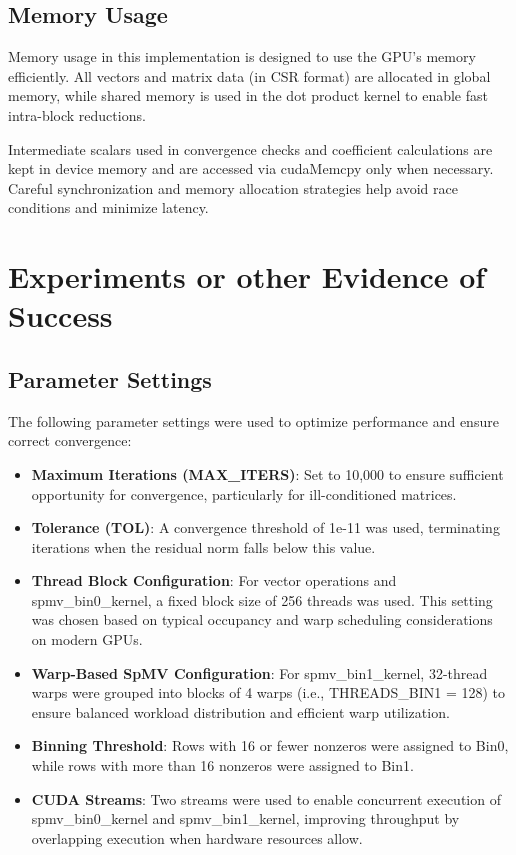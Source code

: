 \documentclass[conference]{IEEEtran}
\begin{document}
\subsection{Memory Usage}
Memory usage in this implementation is designed to use the GPU’s memory efficiently. All vectors and matrix data (in CSR format) are allocated in global memory, while shared memory is used in the dot product kernel to enable fast intra-block reductions. 

Intermediate scalars used in convergence checks and coefficient calculations are kept in device memory and are accessed via cudaMemcpy only when necessary. Careful synchronization and memory allocation strategies help avoid race conditions and minimize latency.

\section{Experiments or other Evidence of Success}

\subsection{Parameter Settings}
The following parameter settings were used to optimize performance and ensure correct convergence:
\begin{itemize}
\item \textbf{Maximum Iterations (MAX\_ITERS)}: Set to 10,000 to ensure sufficient opportunity for convergence, particularly for ill-conditioned matrices.
\item \textbf{Tolerance (TOL)}: A convergence threshold of 1e-11 was used, terminating iterations when the residual norm falls below this value.
\item \textbf{Thread Block Configuration}: For vector operations and spmv\_bin0\_kernel, a fixed block size of 256 threads was used. This setting was chosen based on typical occupancy and warp scheduling considerations on modern GPUs.
\item \textbf{Warp-Based SpMV Configuration}: For spmv\_bin1\_kernel, 32-thread warps were grouped into blocks of 4 warps (i.e., THREADS\_BIN1 = 128) to ensure balanced workload distribution and efficient warp utilization.
\item \textbf{Binning Threshold}: Rows with 16 or fewer nonzeros were assigned to Bin0, while rows with more than 16 nonzeros were assigned to Bin1.
\item \textbf{CUDA Streams}: Two streams were used to enable concurrent execution of spmv\_bin0\_kernel and spmv\_bin1\_kernel, improving throughput by overlapping execution when hardware resources allow.
\end{itemize}
\end{document}
